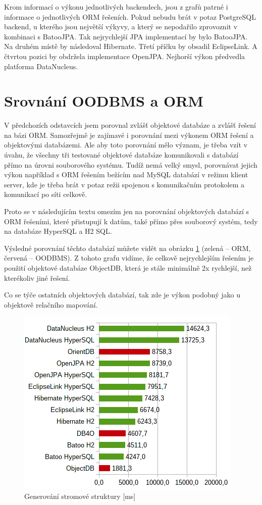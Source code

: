 Krom informací o výkonu jednotlivých backendech, jsou z grafů patrné i informace o jednotlivých ORM řešeních. Pokud nebudu brát v potaz PostgreSQL backend, u kterého jsou největší výkyvy, a který se nepodařilo zprovoznit v kombinaci s BatooJPA. Tak nejrychlejší JPA implementací by bylo BatooJPA. Na druhém místě by následoval Hibernate. Třetí příčku by obsadil EclipseLink. A čtvrtou pozici by obdržela implementace OpenJPA. Nejhorší výkon předvedla platforma DataNucleus.

\section{Srovnání OODBMS a ORM}
V předchozích odstavcích jsem porovnal zvlášť objektové databáze a zvlášť řešení na bázi ORM. Samozřejmě je zajímavé i porovnání mezi výkonem ORM řešení a objektovými databázemi. Ale aby toto porovnání mělo význam, je třeba vzít v úvahu, že všechny tři testované objektové databáze komunikovali s databází přímo na úrovni souborového systému. Tudíž nemá velký smysl, porovnávat jejich výkon například s ORM řešením bežícím nad MySQL databází v režimu klient server, kde je třeba brát v potaz režii spojenou s komunikačním protokolem a komunikací po síti celkově.

Proto se v následujícím textu omezím jen na porovnání objektových databází s ORM řešeními, které přistupují k datům, také přímo přes souborový systém, tedy na databáze HyperSQL a H2 SQL.

Výsledné porovnání těchto databází můžete vidět na obrázku \ref{img:resultf} (zelená -- ORM, červená -- OODBMS). Z tohoto grafu vidíme, že celkově nejrychlejším řešením je použití objektové databáze ObjectDB, která je stále minimálně 2x rychlejší, než kterékoliv jiné řešení.

Co se týče ostatních objektových databází, tak zde je výkon podobný jako u objektově relačního mapování.
\begin{figure}[!h]
  \includegraphics[]{obr/bench/resultf}
  \caption{Generování stromové struktury [ms]}\label{img:resultf}
\end{figure}
